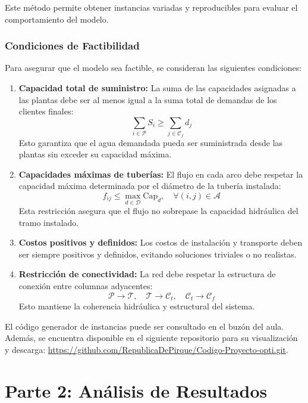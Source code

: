\documentclass[12pt]{article}
\begin{document}
Este método permite obtener instancias variadas y reproducibles para evaluar el comportamiento del modelo.

\subsubsection{Condiciones de Factibilidad}

Para asegurar que el modelo sea factible, se consideran las siguientes condiciones:

\begin{enumerate}
    \item \textbf{Capacidad total de suministro:} La suma de las capacidades asignadas a las plantas debe ser al menos igual a la suma total de demandas de los clientes finales:
    \[
    \sum_{i \in \mathcal{P}} S_i \geq \sum_{j \in \mathcal{C}_f} d_j
    \]
    Esto garantiza que el agua demandada pueda ser suministrada desde las plantas sin exceder su capacidad máxima.
    
    \item \textbf{Capacidades máximas de tuberías:} El flujo en cada arco debe respetar la capacidad máxima determinada por el diámetro de la tubería instalada:
    \[
    f_{ij} \leq \max_{d \in \mathcal{D}} \text{Cap}_d, \quad \forall (i,j) \in \mathcal{A}
    \]
    Esta restricción asegura que el flujo no sobrepase la capacidad hidráulica del tramo instalado.
    
    \item \textbf{Costos positivos y definidos:} Los costos de instalación y transporte deben ser siempre positivos y definidos, evitando soluciones triviales o no realistas.
    
    \item \textbf{Restricción de conectividad:} La red debe respetar la estructura de conexión entre columnas adyacentes:
    \[
    \mathcal{P} \rightarrow \mathcal{T}, \quad \mathcal{T} \rightarrow \mathcal{C}_t, \quad \mathcal{C}_t \rightarrow \mathcal{C}_f
    \]
    Esto mantiene la coherencia hidráulica y estructural del sistema.
\end{enumerate}

El código generador de instancias puede ser consultado en el buzón del aula. Además, se encuentra disponible en el siguiente repositorio para su visualización y descarga: \url{https://github.com/RepublicaDePirque/Codigo-Proyecto-opti.git}.


\clearpage
\section{Parte 2: Análisis de Resultados}
\end{document}
